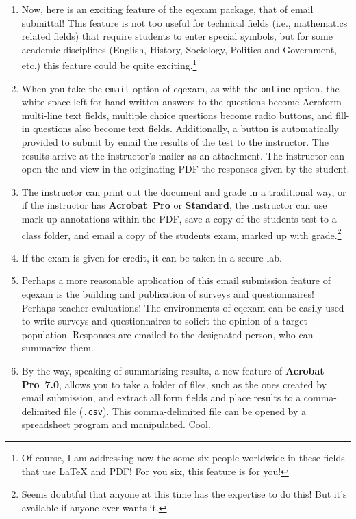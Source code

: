 \documentclass{article}
\def\PDF{PDF}\def\URL{URL}
\begin{document}
\begin{enumerate}
    \item Now, here is an exciting feature of the \textsf{eqexam}
    package, that of email submittal! This feature is not too
    useful for technical fields (i.e., mathematics related fields)
    that require students to enter special symbols, but for some
    academic disciplines (English, History, Sociology, Politics
    and Government, etc.) this feature could be quite
    exciting.\footnote{Of course, I am addressing now the some six
    people worldwide in these fields that use {\LaTeX} and \PDF!
    For you six, this feature is for you!}

    \item[] When you take the \texttt{email} option of
    \textsf{eqexam}, as with the \texttt{online} option, the white
    space left for hand-written answers to the questions become
    Acroform multi-line text fields, multiple choice questions
    become radio buttons, and fill-in questions also become text
    fields. Additionally, a button is automatically provided to
    submit by email the results of the test to the instructor. The
    results arrive at the instructor's mailer as an {\FDF}
    attachment.  The instructor can open the {\FDF} and view in the
    originating {\PDF} the responses given by the student.

    \item[] The instructor can print out the document and grade in
    a traditional way, or if the instructor has
    \textbf{Acrobat~Pro} or \textbf{Standard}, the instructor can
    use mark-up annotations within the PDF, save a copy of the
    students test to a class folder, and email a copy of the
    students exam, marked up with grade.\footnote{Seems doubtful
    that anyone at this time has the expertise to do this! But
    it's available if anyone ever wants it.}

    \item[] If the exam is given for credit, it can be taken in a
    secure lab.

    \item Perhaps a more reasonable application of this email
    submission feature of \textsf{eqexam} is the building and
    publication of surveys and questionnaires! Perhaps
    teacher evaluations! The environments of \textsf{eqexam} can
    be easily used to write surveys and questionnaires to
    solicit the opinion of a target population. Responses are
    emailed to the designated person, who can summarize them.

    \item[] By the way, speaking of summarizing results, a new
    feature of \textbf{Acrobat Pro~7.0}, allows you to take a
    folder of {\FDF} files, such as the ones created by email
    submission, and extract all form fields and place results to a
    comma-delimited file (\texttt{.csv}). This comma-delimited
    file can be opened by a spreadsheet program and manipulated.
    Cool.


\end{enumerate}
\end{document}
